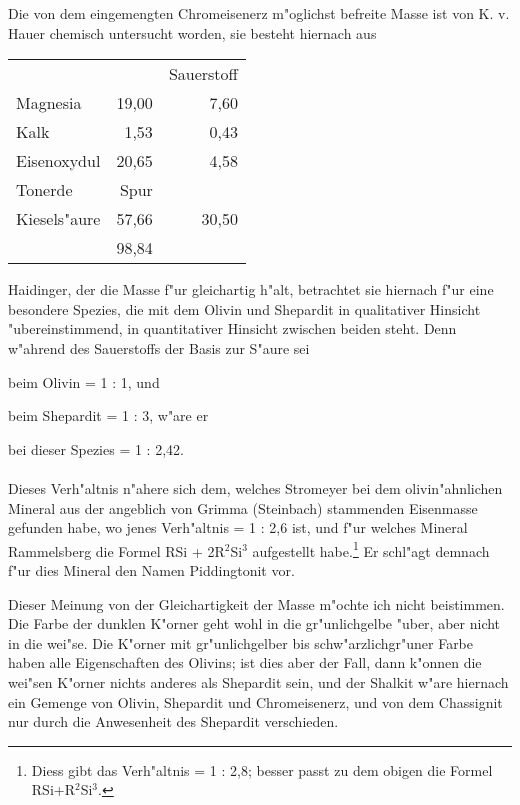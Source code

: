 \documentclass[a4paper, 11pt, oneside]{article}
\begin{document}
Die von dem eingemengten Chromeisenerz m"oglichst befreite Masse ist von K. v. Hauer chemisch untersucht worden, sie besteht hiernach aus
\begin{center}
\begin{tabular}{ l r r }
     & & Sauerstoff\\
    Magnesia & 19,00 & 7,60\\
    Kalk & 1,53 & 0,43\\
    Eisenoxydul & 20,65 & 4,58\\
    Tonerde & Spur & \\
    Kiesels"aure & 57,66 & 30,50\\
     & 98,84\\
\end{tabular}
\end{center}
Haidinger, der die Masse f"ur gleichartig h"alt, betrachtet sie hiernach f"ur eine besondere Spezies, die mit dem Olivin und Shepardit in qualitativer Hinsicht "ubereinstimmend, in quantitativer Hinsicht zwischen beiden steht. Denn w"ahrend des Sauerstoffs der Basis zur S"aure sei
\begin{center}
beim Olivin = 1 : 1, und  
\end{center}
\begin{center}
beim Shepardit = 1 : 3, w"are er  
\end{center}
\begin{center}
bei dieser Spezies = 1 : 2,42.  
\end{center}
\paragraph{}
Dieses Verh"altnis n"ahere sich dem, welches Stromeyer bei dem olivin"ahnlichen Mineral aus der angeblich von Grimma (Steinbach) stammenden Eisenmasse gefunden habe, wo jenes Verh"altnis = 1 : 2,6 ist, und f"ur welches Mineral Rammelsberg die Formel RSi + 2R$^{2}$Si$^{3}$ aufgestellt habe.\footnote{Diess gibt das Verh"altnis = 1 : 2,8; besser passt zu dem obigen die Formel RSi+R$^{2}$Si$^{3}$.} Er schl"agt demnach f"ur dies Mineral den Namen Piddingtonit vor.

Dieser Meinung von der Gleichartigkeit der Masse m"ochte ich nicht beistimmen. Die Farbe der dunklen K"orner geht wohl in die gr"unlichgelbe "uber, aber nicht in die wei"se. Die K"orner mit gr"unlichgelber bis schw"arzlichgr"uner Farbe haben alle Eigenschaften des Olivins; ist dies aber der Fall, dann k"onnen die wei"sen K"orner nichts anderes als Shepardit sein, und der Shalkit w"are hiernach ein Gemenge von Olivin, Shepardit und Chromeisenerz, und von dem Chassignit nur durch die Anwesenheit des Shepardit verschieden.
\end{document}
